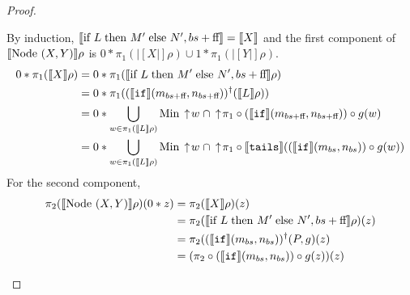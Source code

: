\begin{proof}
\begin{description}
By induction, $|[\textrm{if } L\;\textrm{then } M'\;\textrm{else } N', bs+\textrm{ff }\!\!|] = |[X|]$ and the first component of $|[\textrm{Node }(X,Y)|]\rho$ is 
$0*\pi_1(|[X|]\rho)\cup 1*\pi_1(|[Y|]\rho)$. 
\begin{align*}
0*\pi_1(|[X|]\rho) &= 
0 * \pi_1(|[\If L\;\then M'\;\Else N', bs+\false\!\!|]\rho) \\
&= 0 * \pi_1((|[\texttt{if}|](m_{bs+\false\!\!}, n_{bs+\false\!\!}))^{\dagger}(|[L|]\rho)) \\
&= 0 * \bigcup_{w\in \pi_1(|[L|]\rho)} \Min \ua w \;\cap
\ua \pi_1\circ (|[\texttt{if}|](m_{bs+\false\!\!}, n_{bs+\false\!\!}))\circ g(w) \\
&= 0 * \bigcup_{w\in \pi_1(|[L|]\rho)} \Min \ua w \;\cap
\ua \pi_1\circ |[\texttt{tails}|]((|[\texttt{if}|](m_{bs}, n_{bs}))\circ g(w))
\end{align*}
For the second component,
\begin{align*}
\pi_2 (|[\textrm{Node }(X,Y)|]\rho) (0*z) &= \pi_2 (|[X|]\rho) (z) \\
&= \pi_2 (|[\textrm{if } L\;\textrm{then } M'\;\textrm{else } N', bs+\textrm{ff }\!\!|]\rho)(z) \\
&= \pi_2 ((|[\texttt{if}|](m_{bs}, n_{bs}))^{\dagger}(P,g)(z) \\
&= (\pi_2\circ (|[\texttt{if}|](m_{bs}, n_{bs})) \circ g(z))(z)
\end{align*}


\end{description}
\end{proof}

